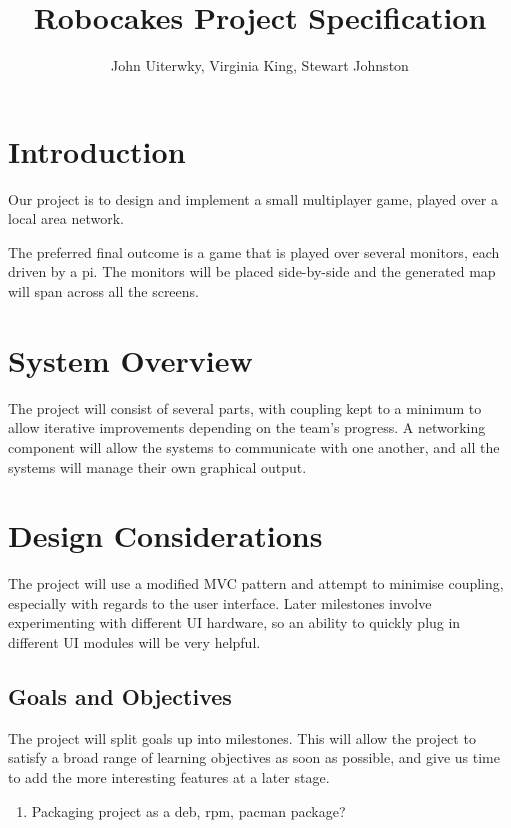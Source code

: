 \documentclass[a4paper]{article}
\begin{document}
\title{Robocakes Project Specification}
\author{John Uiterwky, Virginia King, Stewart Johnston}

\maketitle

\section{Introduction}

Our project is to design and implement a small multiplayer game, played over
a local area network.

The preferred final outcome is a game that is played over several monitors,
each driven by a pi. The monitors will be placed side-by-side and the
generated map will span across all the screens.

\section{System Overview}

The project will consist of several parts, with coupling kept to a minimum to
allow iterative improvements depending on the team's progress. A networking
component will allow the systems to communicate with one another, and all the
systems will manage their own graphical output.

\section{Design Considerations}

The project will use a modified MVC pattern and attempt to minimise coupling,
especially with regards to the user interface. Later milestones involve
experimenting with different UI hardware, so an ability to quickly plug in
different UI modules will be very helpful.

\subsection{Goals and Objectives}

The project will split goals up into milestones. This will allow the project
to satisfy a broad range of learning objectives as soon as possible, and give
us time to add the more interesting features at a later stage.

\begin{enumerate}
  \item Packaging project as a deb, rpm, pacman package?
\end{enumerate}
\end{document}
